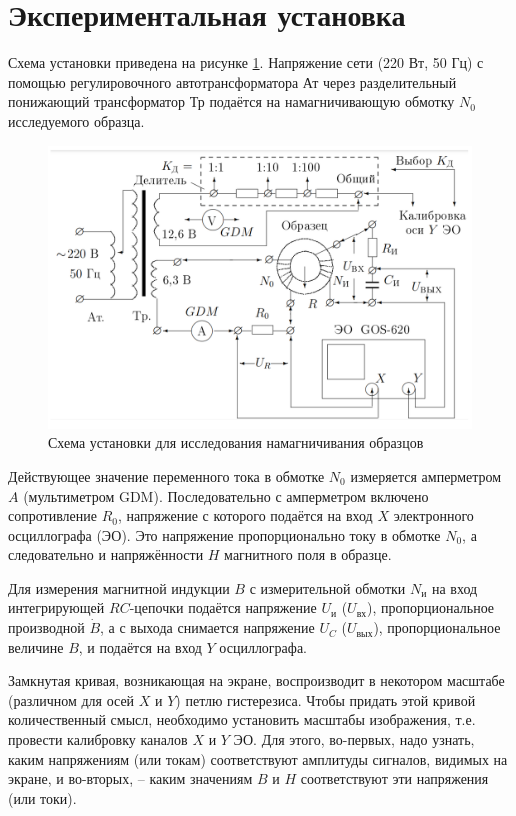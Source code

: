 \documentclass[a4paper, 12pt]{article}
\begin{document}
    \section{Экспериментальная установка}

        Схема установки приведена на рисунке \ref{device}. Напряжение сети (220 Вт, 50 Гц) с помощью регулировочного автотрансформатора Ат через разделительный понижающий трансформатор Тр подаётся на намагничивающую обмотку $N_0$ исследуемого образца.

        \begin{figure}[h]
            \centering
            \includegraphics[scale=0.35]{img/device.png}
            \caption{Схема установки для исследования намагничивания образцов} \label{device}
        \end{figure}

        Действующее значение переменного тока в обмотке $N_0$ измеряется амперметром $A$ (мультиметром GDM). Последовательно с амперметром включено сопротивление $R_0$, напряжение с которого подаётся на вход $X$ электронного осциллографа (ЭО). Это напряжение пропорционально току в обмотке $N_0$, а следовательно и напряжённости $H$ магнитного поля в образце.

        Для измерения магнитной индукции $B$ с измерительной обмотки $N_{\text{и}}$ на вход интегрирующей $RC$-цепочки подаётся напряжение $U_{\text{и}}$ ($U_{\text{вх}}$), пропорциональное производной $\dot{B}$, а с выхода снимается напряжение $U_C$ ($U_{\text{вых}}$), пропорциональное величине $B$, и подаётся на вход $Y$ осциллографа.

        Замкнутая кривая, возникающая на экране, воспроизводит в некотором масштабе (различном для осей $X$ и $Y$) петлю гистерезиса. Чтобы придать этой кривой количественный смысл, необходимо установить масштабы изображения, т.е. провести калибровку каналов $X$ и $Y$ ЭО. Для этого, во-первых, надо узнать, каким напряжениям (или токам) соответствуют амплитуды сигналов, видимых на экране, и во-вторых, -- каким значениям $B$ и $H$ соответствуют эти напряжения (или токи).
\end{document}
